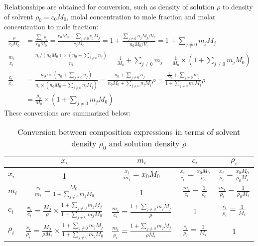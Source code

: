 \documentclass[onecolumn]{article}
\begin{document}
Relationships are obtained for conversion, such as density of solution $\rho$ to density of
solvent $\rho_0 = c_0 M_0$, molal concentration to mole fraction and molar concentration to
mole fraction: \\
\[
\begin{aligned}
\frac{\rho}{c_0 M_0} & = \frac{\sum_{i}{\rho_i}}{c_0 M_0} = \frac{c_0 M_0 + \sum_{j \neq 0}{c_j M_j}}{c_0 M_0} = 1 + \frac{\sum_{j\neq0}{n_j M_j/V_r}}{n_0 M_0/V_r} = 1+\sum_{j\neq0}{m_j M_j}\\
\frac{m_i}{x_i} & = \frac{n_i/(n_0 M_0) \times (n_0 + \sum_{j\neq0}{n_j}) }{n_i} = \frac{1}{M_0} + \sum_{j\neq0}{m_j} = \frac{1}{M_0} \times (1 + \sum_{j\neq0}{m_jM_0}) \\
\frac{c_i}{x_i} & = \frac{n_i \rho \times (n_0 + \sum_{j\neq0}{n_j}) }{n_i \times (n_0 M_0 + \sum_{j\neq0}{n_j M_j})} = \frac{ n_0 + \sum_{j\neq0}{n_j} }{ n_0 M_0 + \sum_{j\neq0}{n_j M_j}} \rho = \frac{ \frac{1}{M_0} + \sum_{j\neq0}{m_j} }{ 1 + \sum_{j\neq0}{m_j M_j}} \rho \\
 & = \frac{\rho_0}{M_0} \times (1 + \sum_{j\neq0}{m_j M_0})
\end{aligned}
\]
These conversions are summarized below:
\begin{table}[h]
\begin{center}
\begin{tabular}{|l|cccc|}
\hline
 			& $x_i$ & $m_i$ & $c_i$ & $\rho_i$ \\
\hline
$x_i$ & 	1		& $\frac{x_i}{m_i} = x_0 M_0$
			&	$\frac{x_i}{c_i} = \frac{x_0 M_0}{\rho_0}$
			& $\frac{x_i}{\rho_i} = \frac{x_0 M_0}{\rho_0 M_i}$ \\
$m_i$ & $\frac{x_i}{m_i} = \frac{M_0}{1 + \sum_{j\neq0}{m_jM_0}}$	& 	1
			&	$\frac{m_i}{c_i} = \frac{1}{\rho_0}$
			& $\frac{m_i}{\rho_i} = \frac{1}{\rho_0 M_i} $\\
$c_i$ &	$\frac{x_i}{c_i} = \frac{M_0}{\rho} \times
			\frac{1+\sum_{j\neq0}{m_j M_j}}{1 + \sum_{j\neq0}{m_j M_0}}$
			& $\frac{m_i}{c_i} = \frac{1+\sum_{j\neq0}{m_j M_j}}{\rho}$
			&		1		& $\frac{c_i}{\rho_i} = \frac{1}{M_i}$ \\
$\rho_i$ & 	$\frac{x_i}{\rho_i} = \frac{M_0}{\rho M_i} \times
			\frac{1+\sum_{j\neq0}{m_j M_j}}{1 + \sum_{j\neq0}{m_j M_0}}$
			& $\frac{m_i}{\rho_i} = \frac{1 + \sum_{j\neq0}{m_j M_j}}{\rho M_i}$
			&	$\frac{c_i}{\rho_i} = \frac{1}{M_i}$	& 1 \\
\hline
\end{tabular}
\end{center}
\caption{Conversion between composition expressions in terms of solvent density
$\rho_0$ and solution density $\rho$}
\label{table:composition_expr_conv}
\end{table}
\end{document}
